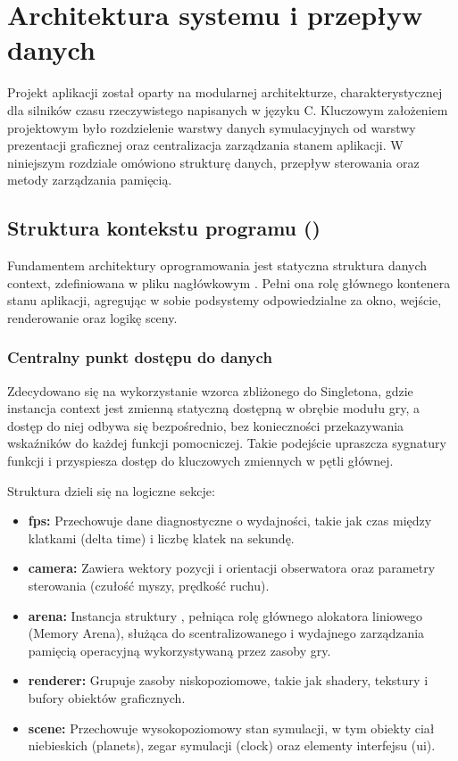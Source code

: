 \chapter{Architektura systemu i przepływ danych}
 Projekt aplikacji został oparty na modularnej architekturze, charakterystycznej dla silników czasu rzeczywistego napisanych w języku C.
 Kluczowym założeniem projektowym było rozdzielenie warstwy danych symulacyjnych od warstwy prezentacji graficznej oraz centralizacja zarządzania stanem aplikacji.
 W niniejszym rozdziale omówiono strukturę danych, przepływ sterowania oraz metody zarządzania pamięcią.

    \section{Struktura kontekstu programu ()}
     Fundamentem architektury oprogramowania jest statyczna struktura danych context, zdefiniowana w pliku nagłówkowym .
     Pełni ona rolę głównego kontenera stanu aplikacji, agregując w sobie podsystemy odpowiedzialne za okno, wejście, renderowanie oraz logikę sceny.

        \subsection{Centralny punkt dostępu do danych}
         Zdecydowano się na wykorzystanie wzorca zbliżonego do Singletona, gdzie instancja context jest zmienną statyczną dostępną w obrębie modułu gry, a dostęp do niej odbywa się bezpośrednio, bez konieczności przekazywania wskaźników do każdej funkcji pomocniczej.
         Takie podejście upraszcza sygnatury funkcji i przyspiesza dostęp do kluczowych zmiennych w pętli głównej.

         \bigbreak

         Struktura dzieli się na logiczne sekcje:
         
         \begin{itemize}
         \item[---] \textbf{fps:} Przechowuje dane diagnostyczne o wydajności, takie jak czas między klatkami (delta time) i liczbę klatek na sekundę.
         \item[---] \textbf{camera:} Zawiera wektory pozycji i orientacji obserwatora oraz parametry sterowania (czułość myszy, prędkość ruchu).
         \item[---] \textbf{arena:} Instancja struktury , pełniąca rolę głównego alokatora liniowego (Memory Arena), służąca do scentralizowanego i wydajnego zarządzania pamięcią operacyjną wykorzystywaną przez zasoby gry.
         \item[---] \textbf{renderer:} Grupuje zasoby niskopoziomowe, takie jak shadery, tekstury i bufory obiektów graficznych.
         \item[---] \textbf{scene:} Przechowuje wysokopoziomowy stan symulacji, w tym obiekty ciał niebieskich (planets), zegar symulacji (clock) oraz elementy interfejsu (ui).
         \end{itemize}


